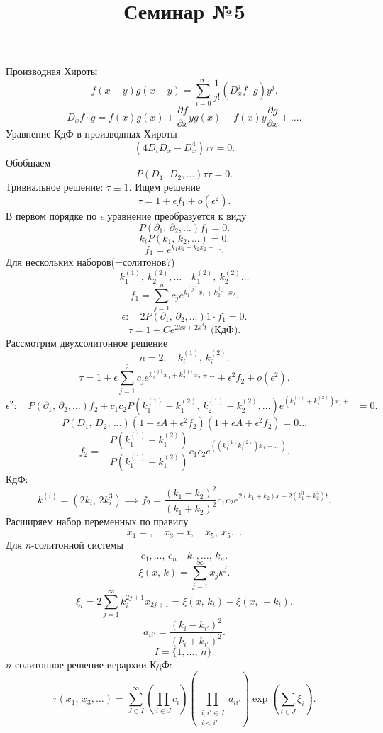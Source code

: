 \documentclass[a4paper]{article}
\title{Семинар №5}
\begin{document}
	\maketitle
	Производная Хироты
	\[
		f(x-y)g(x-y)= \sum_{i=0}^{\infty} \frac{1}{j!}\left( D_x^j f\cdot g \right) y^j
	.\] 
	\[
		D_x f\cdot g=  f(x) g(x) + \frac{\partial f}{\partial x}  y g(x) - f(x) y \frac{\partial g}{\partial x} +\ldots
	.\] 
	Уравнение КдФ в производных Хироты
	\[
		(4 D_t D_x -D_x^4) \tau \tau=0
	.\] 
	Обобщаем
	\[
		P(D_1,\, D_2,\ldots)\tau \tau=0
	.\] 
	Тривиальное решение: $\tau\equiv 1$.
	Ищем решение
\[
	\tau= 1+ \epsilon f_1 +o(\epsilon^2)
.\] 
В первом порядке по $\epsilon$ уравнение преобразуется к виду
\[
	P(\partial_1,\, \partial_2,\ldots) f_1=0
.\] 
\[
	k_i P (k_1,\,k_2,\ldots)=0
.\] 
\[
f_1= e^{k_1 x_1 + k_2 x_2 +\ldots}
.\] 
Для нескольких наборов(=солитонов?)
\[
k_1^{(1)},\ k_2^{(2)},\ldots\quad k_1^{(2)},\ k_2 ^{(2)}\ldots
\] 
\[
f_1= \sum_{j=1}^{n}  c_j e^{ k_1 ^{(j)} x_1+ k_2 ^{(j)} x_2}
.\] 
\[
	\epsilon:\quad 2P(\partial_1,\,\partial_2,\ldots)1\cdot f_1=0
.\] 
\[
	\tau=1+ C e^{2kx+2k^3 t} \text{ (КдФ)}
.\] 
Рассмотрим двухсолитонное решение
\[
n=2:\quad k_i^{(1)},\,k_i ^{(2)}
.\] 
\[
\tau= 1 +\epsilon \sum_{j=1}^{2} c_j e^{k_1 ^{(j)}x_1+ k_2 ^{(j)}x_2+
\ldots}+\epsilon^2 f_2 +o(\epsilon^2)
.\] 
\[
	\epsilon^2 :\quad P(\partial_1,\,\partial_2,\ldots)f_2+
	c_1 c_2 P(k_1 ^{(1)}-k_1 ^{(2)},\, k_2 ^{(1)}- k_2 ^{(2)},\ldots) e^{\left( k_1 ^{(1)}+ k_1 ^{(2)} \right) x_1 + \ldots}=0
.\] 
\[
	P\left( D_1,\,D_2,\,\ldots \right) \left( 
	1+\epsilon A +\epsilon^2 f_2\right)\left( 1+\epsilon A+
\epsilon^2 f_2\right) =0\ldots
\] 
\[
	f_2=- \frac{P\left( k_1 ^{(1)}-k_1 ^{(2)} \right) }{P
	\left( k_1 ^{(1)}+k_1 ^{(2)} \right) }c_1 c_2 e^{
\left( \left( k_1^{(1)}k_1 ^{(2)} \right) x_1+\ldots \right) }
.\] 
КдФ:
\[
	k^{(i)}=\left( 2k_i,\,2k_i ^3 \right) \implies
	f_2=  \frac{\left( k_1-k_2 \right) ^2}{(k_1+k_2)^2}c_1 c_2
	e^{2(k_1+k_2)x +2 \left( k_1 ^3+k_2^3 \right) t}
.\] 
Расширяем набор переменных по правилу
\[
x_1=,\quad x_3=t,\quad x_5,\ x_5\ldots
.\] 
Для $n$-солитонной системы
\[
c_1,\ldots,\, c_n\quad k_1 ,\ldots,\, k_n
.\] 
\[
	\xi(x,\,k)= \sum_{j=1}^{\infty} x_j k^j
.\] 
\[
\xi_i = 2 \sum_{j=1}^{\infty} k_i^{2j+1} x_{2j+1}=
\xi(x,\,k_i)- \xi(x,\,-k_i)
.\] 
\[
	a_{i i'}= \frac{\left( k_i - k_{i'} \right) ^2}{
	(k_i+k_{i'})^2}
.\] 
\[
I= \{1,\ldots,\,n\} 
.\] 
$n$-солитонное решение иерархии КдФ:
\[
	\tau(x_1,\,x_3,\ldots)= \sum_{J \subset I}^{\infty}
	\left( \prod_{i \in  J}^{} c_i  \right) 
	\left(  \prod_{\substack{i,i' \in J\\ i< i'}}^{}a_{i i'}  \right)  \exp \left( \sum_{i \in J}^{} \xi_i \right) 
.\] 
\end{document}
